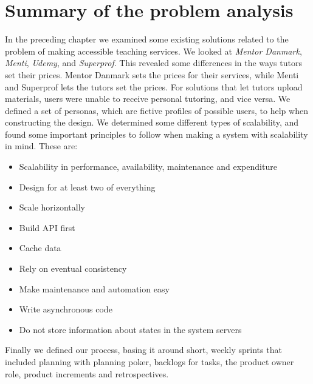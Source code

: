 \section{Summary of the problem analysis}
In the preceding chapter we examined some existing solutions related to the problem of making accessible teaching services.
We looked at \textit{Mentor Danmark}, \textit{Menti}, \textit{Udemy}, and \textit{Superprof}.
This revealed some differences in the ways tutors set their prices.
Mentor Danmark sets the prices for their services, while Menti and Superprof lets the tutors set the prices.
For solutions that let tutors upload materials, users were unable to receive personal tutoring, and vice versa.
We defined a set of personas, which are fictive profiles of possible users, to help when constructing the design.
We determined some different types of scalability, and found some important principles to follow when making a system with scalability in mind.
These are:
\begin{itemize}
    \item Scalability in performance, availability, maintenance and expenditure
    \item Design for at least two of everything
    \item Scale horizontally
    \item Build API first
    \item Cache data
    \item Rely on eventual consistency
    \item Make maintenance and automation easy
    \item Write asynchronous code
    \item Do not store information about states in the system servers
\end{itemize}
Finally we defined our process, basing it around short, weekly sprints that included planning with planning poker, backlogs for tasks, the product owner role, product increments and retrospectives.
